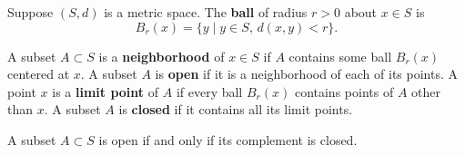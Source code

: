 Suppose $(S, d)$ is a metric space. The \textbf{ball} of radius $r > 0$ about $x \in S$ is
$$B_r(x) = \{y \mid y \in S, \, d(x, y) < r\}.$$

A subset $A \subset S$ is a \textbf{neighborhood} of $x \in S$ if $A$ contains some ball $B_r(x)$ centered at $x$. A subset $A$ is \textbf{open} if it is a neighborhood of each of its points. A point $x$ is a \textbf{limit point} of $A$ if every ball $B_r(x)$ contains points of $A$ other than $x$. A subset $A$ is \textbf{closed} if it contains all its limit points.

A subset $A \subset S$ is open if and only if its complement is closed.
